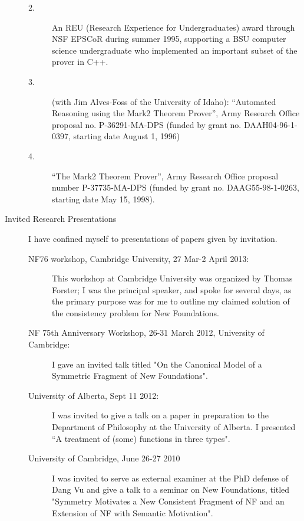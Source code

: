 \begin{description}
\begin{description}
\item[2.] An REU (Research Experience for Undergraduates) award through NSF
EPSCoR during summer 1995, supporting a BSU computer science
undergraduate who implemented an important subset of the prover in
C++.

\item[3.] (with Jim Alves-Foss of the University of Idaho):  ``Automated Reasoning using the Mark2 Theorem Prover'', Army Research Office proposal no.  P-36291-MA-DPS (funded
by grant no.  DAAH04-96-1-0397, starting date August 1, 1996) 

\item[4.] ``The Mark2 Theorem Prover'', Army Research Office proposal
number P-37735-MA-DPS (funded by grant no. DAAG55-98-1-0263, starting
date May 15, 1998).

\end{description}

\newpage

\item[Invited Research Presentations]

I have confined myself to presentations of papers given by invitation.

\begin{description}
\item[NF76 workshop, Cambridge University, 27 Mar-2 April 2013:]  This workshop at Cambridge University was organized by Thomas Forster; I was the principal speaker, and spoke for several days, as the primary purpose was for me to outline my claimed solution of the consistency problem for New Foundations.

\item[NF 75th Anniversary Workshop, 26-31 March 2012, University of Cambridge:]  I gave an invited talk titled "On the Canonical Model of a Symmetric Fragment of New Foundations". 

\item[University of Alberta, Sept 11 2012:]  I was invited to give a talk on a paper in preparation to the Department of Philosophy at the University of Alberta.   I presented ``A treatment of (some) functions in three types".

\item[University of Cambridge, June 26-27 2010]  I was invited to serve as external examiner at the  PhD defense of Dang Vu and give a talk to a seminar on New Foundations, titled "Symmetry Motivates a New Consistent Fragment of NF and an Extension of NF with Semantic Motivation".


\end{description}
\end{description}
